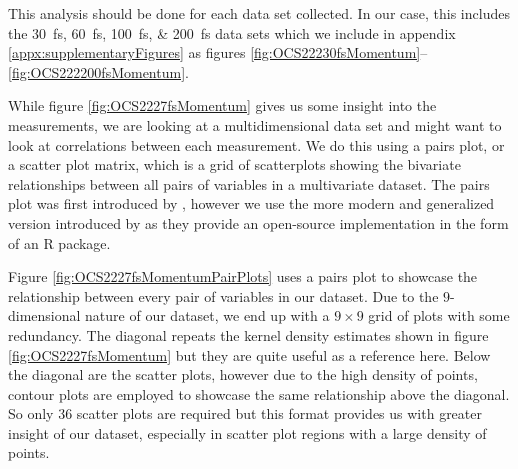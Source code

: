 This analysis should be done for each data set collected. In our case, this includes the \SIlist{30;60;100;200}{\fs} data sets which we include in appendix \ref{appx:supplementaryFigures} as figures \ref{fig:OCS22230fsMomentum}--\ref{fig:OCS222200fsMomentum}.

While figure \ref{fig:OCS2227fsMomentum} gives us some insight into the measurements, we are looking at a multidimensional data set and might want to look at correlations between each measurement. We do this using a pairs plot, or a scatter plot matrix, which is a grid of scatterplots showing the bivariate relationships between all pairs of variables in a multivariate dataset. The pairs plot was first introduced by \citet{Hartigan75}, however we use the more modern and generalized version introduced by \citet{Emerson13} as they provide an open-source implementation in the form of an R package.

Figure \ref{fig:OCS2227fsMomentumPairPlots} uses a pairs plot to showcase the relationship between every pair of variables in our dataset. Due to the $9$-dimensional nature of our dataset, we end up with a $9\times9$ grid of plots with some redundancy. The diagonal repeats the kernel density estimates shown in figure \ref{fig:OCS2227fsMomentum} but they are quite useful as a reference here. Below the diagonal are the scatter plots, however due to the high density of points, contour plots are employed to showcase the same relationship above the diagonal. So only 36 scatter plots are required but this format provides us with greater insight of our dataset, especially in scatter plot regions with a large density of points.

